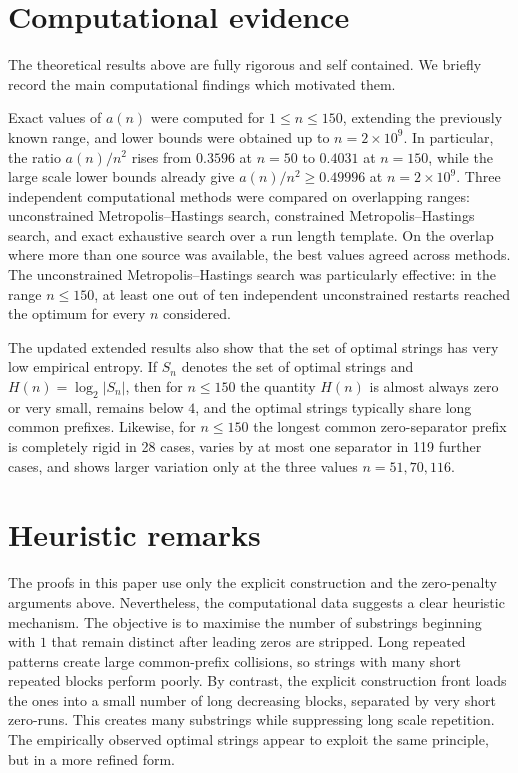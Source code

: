 \documentclass[11pt]{article}
\begin{document}
\section{Computational evidence}

The theoretical results above are fully rigorous and self contained.  We briefly record the main computational findings which motivated them.

Exact values of $a(n)$ were computed for $1\le n\le 150$, extending the previously known range, and lower bounds were obtained up to $n=2\times 10^9$.  In particular, the ratio $a(n)/n^2$ rises from $0.3596$ at $n=50$ to $0.4031$ at $n=150$, while the large scale lower bounds already give $a(n)/n^2\ge 0.49996$ at $n=2\times 10^9$.  Three independent computational methods were compared on overlapping ranges: unconstrained Metropolis--Hastings search, constrained Metropolis--Hastings search, and exact exhaustive search over a run length template.  On the overlap where more than one source was available, the best values agreed across methods.  The unconstrained Metropolis--Hastings search was particularly effective: in the range $n\le 150$, at least one out of ten independent unconstrained restarts reached the optimum for every $n$ considered.

The updated extended results also show that the set of optimal strings has very low empirical entropy.  If $S_n$ denotes the set of optimal strings and $H(n)=\log_2|S_n|$, then for $n\le 150$ the quantity $H(n)$ is almost always zero or very small, remains below $4$, and the optimal strings typically share long common prefixes.  Likewise, for $n\le 150$ the longest common zero-separator prefix is completely rigid in 28 cases, varies by at most one separator in 119 further cases, and shows larger variation only at the three values $n=51,70,116$.

\section{Heuristic remarks}

The proofs in this paper use only the explicit construction and the zero-penalty arguments above.  Nevertheless, the computational data suggests a clear heuristic mechanism.  The objective is to maximise the number of substrings beginning with $1$ that remain distinct after leading zeros are stripped.  Long repeated patterns create large common-prefix collisions, so strings with many short repeated blocks perform poorly.  By contrast, the explicit construction front loads the ones into a small number of long decreasing blocks, separated by very short zero-runs.  This creates many substrings while suppressing long scale repetition.  The empirically observed optimal strings appear to exploit the same principle, but in a more refined form.
\end{document}
